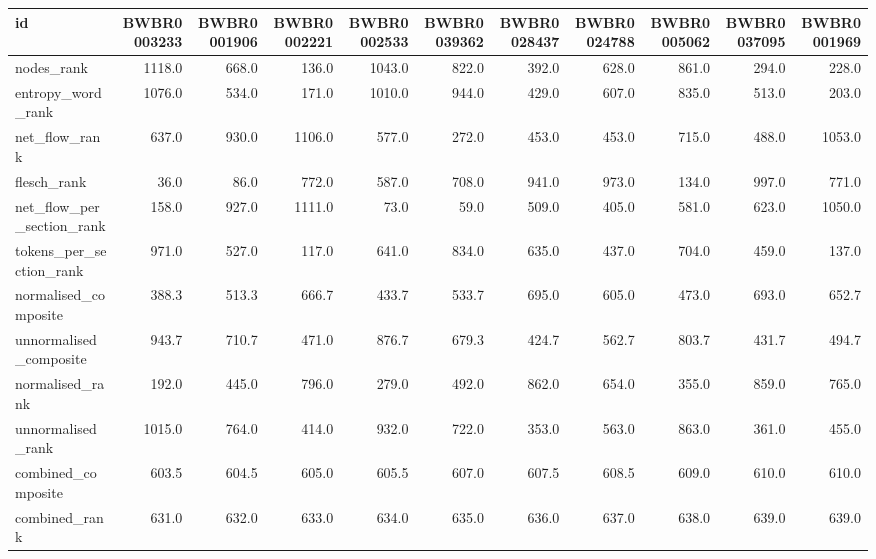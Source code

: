 \begin{tabular}{lrrrrrrrrrr}
\toprule
id & BWBR0003233 & BWBR0001906 & BWBR0002221 & BWBR0002533 & BWBR0039362 & BWBR0028437 & BWBR0024788 & BWBR0005062 & BWBR0037095 & BWBR0001969 \\
\midrule
nodes\_rank & 1118.0 & 668.0 & 136.0 & 1043.0 & 822.0 & 392.0 & 628.0 & 861.0 & 294.0 & 228.0 \\
\cline{1-11}
entropy\_word\_rank & 1076.0 & 534.0 & 171.0 & 1010.0 & 944.0 & 429.0 & 607.0 & 835.0 & 513.0 & 203.0 \\
\cline{1-11}
net\_flow\_rank & 637.0 & 930.0 & 1106.0 & 577.0 & 272.0 & 453.0 & 453.0 & 715.0 & 488.0 & 1053.0 \\
\cline{1-11}
flesch\_rank & 36.0 & 86.0 & 772.0 & 587.0 & 708.0 & 941.0 & 973.0 & 134.0 & 997.0 & 771.0 \\
\cline{1-11}
net\_flow\_per\_section\_rank & 158.0 & 927.0 & 1111.0 & 73.0 & 59.0 & 509.0 & 405.0 & 581.0 & 623.0 & 1050.0 \\
\cline{1-11}
tokens\_per\_section\_rank & 971.0 & 527.0 & 117.0 & 641.0 & 834.0 & 635.0 & 437.0 & 704.0 & 459.0 & 137.0 \\
\cline{1-11}
normalised\_composite & 388.3 & 513.3 & 666.7 & 433.7 & 533.7 & 695.0 & 605.0 & 473.0 & 693.0 & 652.7 \\
\cline{1-11}
unnormalised\_composite & 943.7 & 710.7 & 471.0 & 876.7 & 679.3 & 424.7 & 562.7 & 803.7 & 431.7 & 494.7 \\
\cline{1-11}
normalised\_rank & 192.0 & 445.0 & 796.0 & 279.0 & 492.0 & 862.0 & 654.0 & 355.0 & 859.0 & 765.0 \\
\cline{1-11}
unnormalised\_rank & 1015.0 & 764.0 & 414.0 & 932.0 & 722.0 & 353.0 & 563.0 & 863.0 & 361.0 & 455.0 \\
\cline{1-11}
combined\_composite & 603.5 & 604.5 & 605.0 & 605.5 & 607.0 & 607.5 & 608.5 & 609.0 & 610.0 & 610.0 \\
\cline{1-11}
combined\_rank & 631.0 & 632.0 & 633.0 & 634.0 & 635.0 & 636.0 & 637.0 & 638.0 & 639.0 & 639.0 \\
\cline{1-11}
\bottomrule
\end{tabular}
